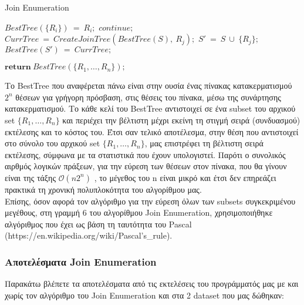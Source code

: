\documentclass[12pt, a4paper]{article}
\begin{document}
\begin{algorithm}[hbt!]
\caption{Join Enumeration}
\begin{algorithmic}[1]
		\State $BestTree(\{R_i\})\ =\ R_i;$	
	\EndFor
					\State $continue;$
				\EndIf
				\State $CurrTree\ =\ CreateJoinTree(BestTree(S),\ R_j);$
				\State $S'\ =\ S\ \cup\ \{R_j\};$
					\State $BestTree(S')\ =\ CurrTree;$
				\EndIf
			\EndFor
		\EndFor
	\EndFor

	\State $\textbf{return}\ BestTree(\{R_1,\ldots,R_n\});$

\EndFunction
\end{algorithmic}
\end{algorithm}


Το BestTree που αναφέρεται πάνω είναι στην ουσία ένας πίνακας κατακερματισμού $2^{n}$ θέσεων για γρήγορη πρόσβαση, στις θέσεις του πίνακα, μέσω της συνάρτησης κατακερματισμού. Το κάθε κελί του BestTree αντιστοιχεί σε ένα subset του αρχικού set $\{R_1,\ldots,R_n\}$ και περιέχει την βέλτιστη μέχρι εκείνη τη στιγμή σειρά (συνδυασμού) εκτέλεσης και το κόστος του. Έτσι σαν τελικό αποτέλεσμα, στην θέση που αντιστοιχεί στο σύνολο του αρχικού set $\{R_1,\ldots,R_n\}$, μας επιστρέφει τη βέλτιστη σειρά εκτέλεσης, σύμφωνα με τα στατιστικά που έχουν υπολογιστεί. Παρότι ο συνολικός αιρθμός λογικών πράξεων, για την εύρεση των θέσεων στον πίνακα, που θα γίνουν είναι της τάξης $\mathcal{O}(n2^{n})$ , το μέγεθος του n είναι μικρό και έτσι δεν επηρεάζει πρακτικά τη χρονική πολυπλοκότητα του αλγορίθμου μας.\\
Επίσης, όσον αφορά τον αλγόριθμο για την εύρεση όλων των subsets συγκεκριμένου μεγέθους, στη γραμμή 6 του αλγορίθμου Join Enumeration, χρησιμοποιήθηκε αλγόριθμος που έχει ως βάση τη ταυτότητα του Pascal (https://en.wikipedia.org/wiki/Pascal's\_rule). \\

\subsubsection{Αποτελέσματα Join Enumeration}

Παρακάτω βλέπετε τα αποτελέσματα από τις εκτελέσεις του προγράμματός μας με και χωρίς τον αλγόριθμο του Join Enumeration και στα 2 dataset που μας δώθηκαν:
\end{document}
